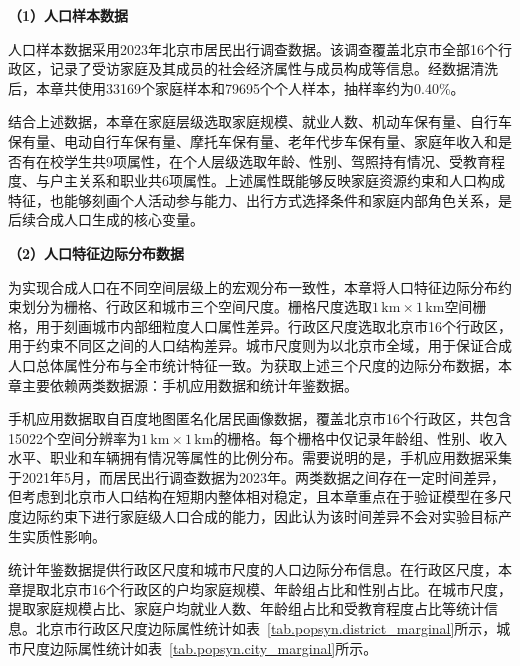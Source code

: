 \textbf{（1）人口样本数据}

人口样本数据采用2023年北京市居民出行调查数据。该调查覆盖北京市全部16个行政区，记录了受访家庭及其成员的社会经济属性与成员构成等信息。经数据清洗后，本章共使用33169个家庭样本和79695个个人样本，抽样率约为0.40\%。

结合上述数据，本章在家庭层级选取家庭规模、就业人数、机动车保有量、自行车保有量、电动自行车保有量、摩托车保有量、老年代步车保有量、家庭年收入和是否有在校学生共9项属性，在个人层级选取年龄、性别、驾照持有情况、受教育程度、与户主关系和职业共6项属性。上述属性既能够反映家庭资源约束和人口构成特征，也能够刻画个人活动参与能力、出行方式选择条件和家庭内部角色关系，是后续合成人口生成的核心变量。

\textbf{（2）人口特征边际分布数据}

为实现合成人口在不同空间层级上的宏观分布一致性，本章将人口特征边际分布约束划分为栅格、行政区和城市三个空间尺度。栅格尺度选取$1\,\mathrm{km}\times1\,\mathrm{km}$空间栅格，用于刻画城市内部细粒度人口属性差异。行政区尺度选取北京市16个行政区，用于约束不同区之间的人口结构差异。城市尺度则为以北京市全域，用于保证合成人口总体属性分布与全市统计特征一致。为获取上述三个尺度的边际分布数据，本章主要依赖两类数据源：手机应用数据和统计年鉴数据。

手机应用数据取自百度地图匿名化居民画像数据，覆盖北京市16个行政区，共包含15022个空间分辨率为$1\,\mathrm{km}\times1\,\mathrm{km}$的栅格。每个栅格中仅记录年龄组、性别、收入水平、职业和车辆拥有情况等属性的比例分布。需要说明的是，手机应用数据采集于2021年5月，而居民出行调查数据为2023年。两类数据之间存在一定时间差异，但考虑到北京市人口结构在短期内整体相对稳定，且本章重点在于验证模型在多尺度边际约束下进行家庭级人口合成的能力，因此认为该时间差异不会对实验目标产生实质性影响。

统计年鉴数据提供行政区尺度和城市尺度的人口边际分布信息。在行政区尺度，本章提取北京市16个行政区的户均家庭规模、年龄组占比和性别占比。在城市尺度，提取家庭规模占比、家庭户均就业人数、年龄组占比和受教育程度占比等统计信息。北京市行政区尺度边际属性统计如表~\ref{tab.popsyn.district_marginal}所示，城市尺度边际属性统计如表~\ref{tab.popsyn.city_marginal}所示。

